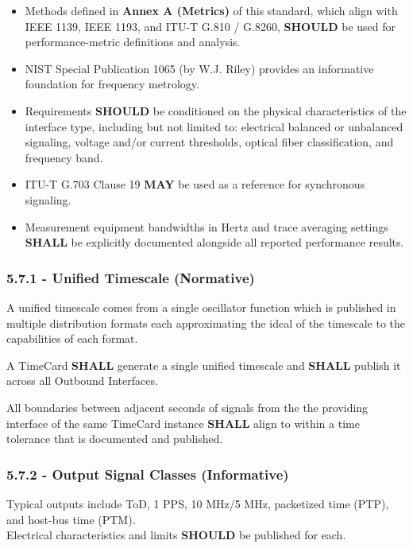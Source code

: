 \begin{itemize}
\tightlist
\item
  Methods defined in \textbf{Annex A (Metrics)} of this standard, which
  align with IEEE 1139, IEEE 1193, and ITU-T G.810 / G.8260,
  \textbf{SHOULD} be used for performance-metric definitions and
  analysis.
\item
  NIST Special Publication 1065 (by W.J. Riley) provides an informative
  foundation for frequency metrology.
\item
  Requirements \textbf{SHOULD} be conditioned on the physical
  characteristics of the interface type, including but not limited to:
  electrical balanced or unbalanced signaling, voltage and/or current
  thresholds, optical fiber classification, and frequency band.
\item
  ITU-T G.703 Clause 19 \textbf{MAY} be used as a reference for
  synchronous signaling.
\item
  Measurement equipment bandwidths in Hertz and trace averaging settings
  \textbf{SHALL} be explicitly documented alongside all reported
  performance results.
\end{itemize}

\subsubsection{5.7.1 - Unified Timescale
(Normative)}\label{unified-timescale-normative}

A unified timescale comes from a single oscillator function which is
published in multiple distribution formats each approximating the ideal
of the timescale to the capabilities of each format.

A TimeCard \textbf{SHALL} generate a single unified timescale and
\textbf{SHALL} publish it across all Outbound Interfaces.

All boundaries between adjacent seconds of signals from the the
providing interface of the same TimeCard instance \textbf{SHALL} align
to within a time tolerance that is documented and published.

\subsubsection{5.7.2 - Output Signal Classes
(Informative)}\label{output-signal-classes-informative}

Typical outputs include ToD, 1 PPS, 10 MHz/5 MHz, packetized time (PTP),
and host-bus time (PTM).\\
Electrical characteristics and limits \textbf{SHOULD} be published for
each.

